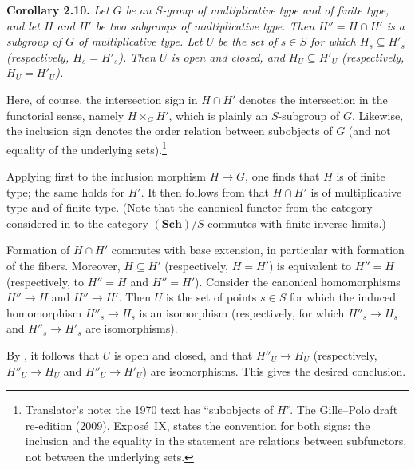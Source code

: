 \medskip
\noindent{}\textbf{Corollary 2.10.}
\textit{Let \(G\) be an \(S\)-group of multiplicative type and of finite
type, and let \(H\) and \(H'\) be two subgroups of multiplicative type.
Then \(H''=H\cap H'\) is a subgroup of \(G\) of multiplicative type. Let
\(U\) be the set of \(s\in S\) for which \(H_s\subseteq H'_s\)
(respectively, \(H_s=H'_s\)). Then \(U\) is open and closed, and
\(H_U\subseteq H'_U\) (respectively, \(H_U=H'_U\)).}

Here, of course, the intersection sign in \(H\cap H'\) denotes the
intersection in the functorial sense, namely \(H\times_GH'\), which is
plainly an \(S\)-subgroup of \(G\). Likewise, the inclusion sign
denotes the order relation between subobjects of \(G\) (and not
equality of the underlying sets).\footnote{Translator's note: the 1970 text has ``subobjects of \(H\)''. The Gille--Polo draft re-edition (2009), Expos\'e~IX, states the convention for both signs: the inclusion and the equality in the statement are relations between subfunctors, not between the underlying sets.}

Applying  first to the inclusion
morphism \(H\to G\), one finds that \(H\) is of finite type; the same
holds for \(H'\). It then follows from
 that \(H\cap H'\) is of
multiplicative type and of finite type. (Note that the canonical functor
from the category considered in 
to the category \((\mathbf{Sch})/S\) commutes with finite inverse limits.)

Formation of \(H\cap H'\) commutes with base extension, in particular
with formation of the fibers. Moreover,
\(H\subseteq H'\) (respectively, \(H=H'\)) is equivalent to
\(H''=H\) (respectively, to \(H''=H\) and \(H''=H'\)). Consider the
canonical homomorphisms \(H''\to H\) and \(H''\to H'\). Then \(U\) is the
set of points \(s\in S\) for which the induced homomorphism
\(H''_s\to H_s\) is an isomorphism (respectively, for which
\(H''_s\to H_s\) and \(H''_s\to H'_s\) are isomorphisms).

By , it follows that \(U\) is open
and closed, and that \(H''_U\to H_U\) (respectively,
\(H''_U\to H_U\) and \(H''_U\to H'_U\)) are isomorphisms. This gives the
desired conclusion.

